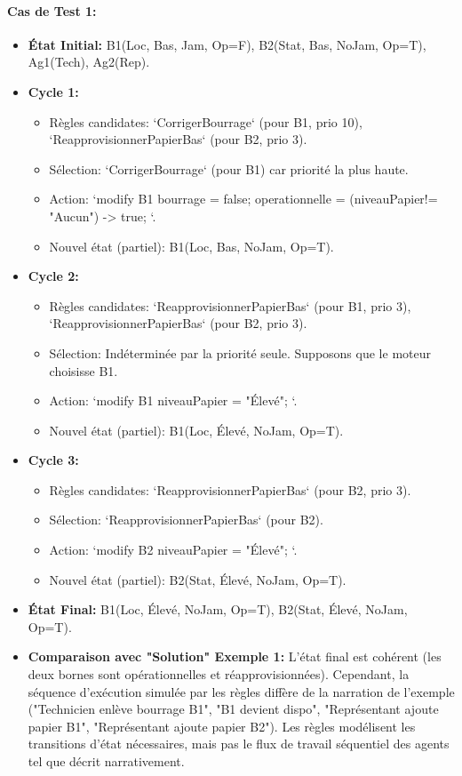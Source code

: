 \documentclass[11pt,a4paper]{article}
\begin{document}
\paragraph{Cas de Test 1:}
\begin{itemize}
    \item \textbf{État Initial:} B1(Loc, Bas, Jam, Op=F), B2(Stat, Bas, NoJam, Op=T), Ag1(Tech), Ag2(Rep).
    \item \textbf{Cycle 1:}
        \begin{itemize}
            \item Règles candidates: `CorrigerBourrage` (pour B1, prio 10), `ReapprovisionnerPapierBas` (pour B2, prio 3).
            \item Sélection: `CorrigerBourrage` (pour B1) car priorité la plus haute.
            \item Action: `modify B1 { bourrage = false; operationnelle = (niveauPapier!= "Aucun") -> true; }`.
            \item Nouvel état (partiel): B1(Loc, Bas, NoJam, Op=T).
        \end{itemize}
    \item \textbf{Cycle 2:}
        \begin{itemize}
            \item Règles candidates: `ReapprovisionnerPapierBas` (pour B1, prio 3), `ReapprovisionnerPapierBas` (pour B2, prio 3).
            \item Sélection: Indéterminée par la priorité seule. Supposons que le moteur choisisse B1.
            \item Action: `modify B1 { niveauPapier = "Élevé"; }`.
            \item Nouvel état (partiel): B1(Loc, Élevé, NoJam, Op=T).
        \end{itemize}
    \item \textbf{Cycle 3:}
        \begin{itemize}
            \item Règles candidates: `ReapprovisionnerPapierBas` (pour B2, prio 3).
            \item Sélection: `ReapprovisionnerPapierBas` (pour B2).
            \item Action: `modify B2 { niveauPapier = "Élevé"; }`.
            \item Nouvel état (partiel): B2(Stat, Élevé, NoJam, Op=T).
        \end{itemize}
    \item \textbf{État Final:} B1(Loc, Élevé, NoJam, Op=T), B2(Stat, Élevé, NoJam, Op=T).
    \item \textbf{Comparaison avec "Solution" Exemple 1:} L'état final est cohérent (les deux bornes sont opérationnelles et réapprovisionnées). Cependant, la séquence d'exécution simulée par les règles diffère de la narration de l'exemple ("Technicien enlève bourrage B1", "B1 devient dispo", "Représentant ajoute papier B1", "Représentant ajoute papier B2"). Les règles modélisent les transitions d'état nécessaires, mais pas le flux de travail séquentiel des agents tel que décrit narrativement.
\end{itemize}
\end{document}
